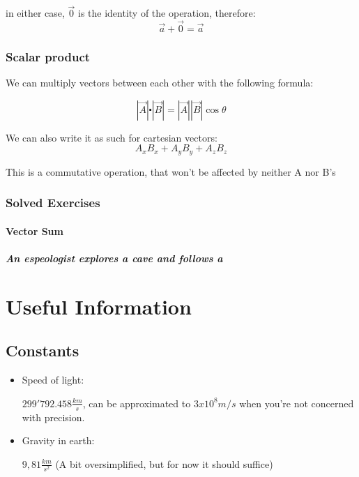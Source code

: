\documentclass[11pt,fleqn]{book} %
\begin{document}
in either case,  $ \vec{0} $ is the identity of the operation, therefore:
\begin{equation}
    \vec{a} + \vec{0} = \vec{a}
\end{equation}


\subsection{Scalar product}
We can multiply vectors between each other with the following formula:

$$ |\vec{A}| \centerdot |\vec{B}| = |\vec{A}||\vec{B}|\cos \theta $$

We can also write it as such for cartesian vectors:
$$ A_x B_x + A_y B_y + A_z B_z $$

This is a commutative operation, that won't be affected by neither A nor B's 


\subsection{Solved Exercises}
\subsubsection{Vector Sum}
\paragraph{An espeologist explores a cave and follows a }



\chapter{Useful Information}

\section{Constants}
\begin{itemize}

    \item Speed of light: 
    
    $299'792.458 \frac{km}{s}$, can be approximated to $ 3x10^8 m/s $ when you're not concerned with precision.

    \item Gravity in earth: 
    
    $ 9,81 \frac{km}{s^2}$ (A bit oversimplified, but for now it should suffice)

\end{itemize}
\end{document}
